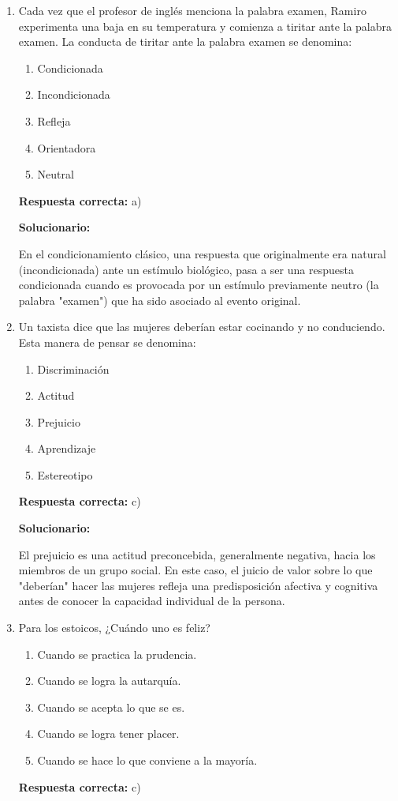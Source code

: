 \begin{enumerate}[resume]

	\item Cada vez que el profesor de inglés menciona la palabra examen, Ramiro experimenta una baja en su temperatura y comienza a tiritar ante la palabra examen. La conducta de tiritar ante la palabra examen se denomina:
	\begin{enumerate}[label=\alph*)]
		\item Condicionada
		\item Incondicionada
		\item Refleja
		\item Orientadora
		\item Neutral
	\end{enumerate}
	\textbf{Respuesta correcta:} a)

	\vspace{2mm}
	\textbf{Solucionario:}

	En el condicionamiento clásico, una respuesta que originalmente era natural (incondicionada) ante un estímulo biológico, pasa a ser una respuesta condicionada cuando es provocada por un estímulo previamente neutro (la palabra "examen") que ha sido asociado al evento original.

	\vspace{6mm}

	\item Un taxista dice que las mujeres deberían estar cocinando y no conduciendo. Esta manera de pensar se denomina:
	\begin{enumerate}[label=\alph*)]
		\item Discriminación
		\item Actitud
		\item Prejuicio
		\item Aprendizaje
		\item Estereotipo
	\end{enumerate}
	\textbf{Respuesta correcta:} c)

	\vspace{2mm}
	\textbf{Solucionario:}

	El prejuicio es una actitud preconcebida, generalmente negativa, hacia los miembros de un grupo social. En este caso, el juicio de valor sobre lo que "deberían" hacer las mujeres refleja una predisposición afectiva y cognitiva antes de conocer la capacidad individual de la persona.

	\vspace{6mm}

	\item Para los estoicos, ¿Cuándo uno es feliz?
	\begin{enumerate}[label=\alph*)]
		\item Cuando se practica la prudencia.
		\item Cuando se logra la autarquía.
		\item Cuando se acepta lo que se es.
		\item Cuando se logra tener placer.
		\item Cuando se hace lo que conviene a la mayoría.
	\end{enumerate}
	\textbf{Respuesta correcta:} c)


\end{enumerate}
